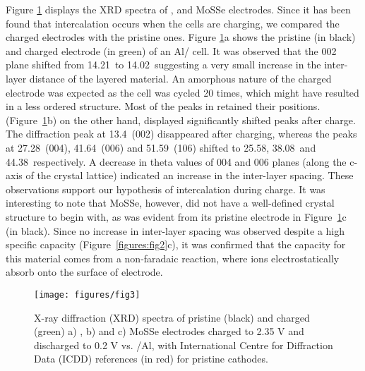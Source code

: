 Figure \ref{figures:fig3} displays the XRD spectra of ,  and MoSSe electrodes. Since it has been found that intercalation occurs when the cells are charging, we compared the charged electrodes with the pristine ones. Figure \ref{figures:fig3}a shows the pristine (in black) and charged electrode (in green) of an Al/ cell. It was observed that the 002 plane shifted from 14.21\degree\ to 14.02\degree\ suggesting a very small increase in the inter-layer distance of the layered material. An amorphous nature of the charged electrode was expected as the cell was cycled 20 times, which might have resulted in a less ordered structure. Most of the peaks in  retained their positions.  (Figure\ \ref{figures:fig3}b) on the other hand, displayed significantly shifted peaks after charge. The diffraction peak at 13.4\degree\ (002) disappeared after charging, whereas the peaks at 27.28\degree\ (004), 41.64\degree\ (006) and 51.59\degree\ (106) shifted to 25.58\degree , 38.08\degree\  and 44.38\degree\ respectively. A decrease in theta values of 004 and 006 planes (along the c-axis of the crystal lattice) indicated an increase in the inter-layer spacing. These observations support our hypothesis of  intercalation during charge. It was interesting to note that MoSSe, however, did not have a well-defined crystal structure to begin with, as was evident from its pristine electrode in Figure\ \ref{figures:fig3}c (in black). Since no increase in inter-layer spacing was observed despite a high specific capacity (Figure\ \ref{figures:fig2}c), it was confirmed that the capacity for this material comes from a non-faradaic reaction,  where ions electrostatically absorb onto the surface of electrode. 
\begin{figure}[htb!]
\centering
\texttt{[image: figures/fig3]}
\caption{X-ray diffraction (XRD) spectra of pristine (black) and charged (green) a) , b)  and c) MoSSe electrodes charged to 2.35 V and discharged to 0.2 V vs. /Al, with International Centre for Diffraction Data (ICDD) references (in red) for pristine cathodes.}
\label{figures:fig3}
\end{figure}


